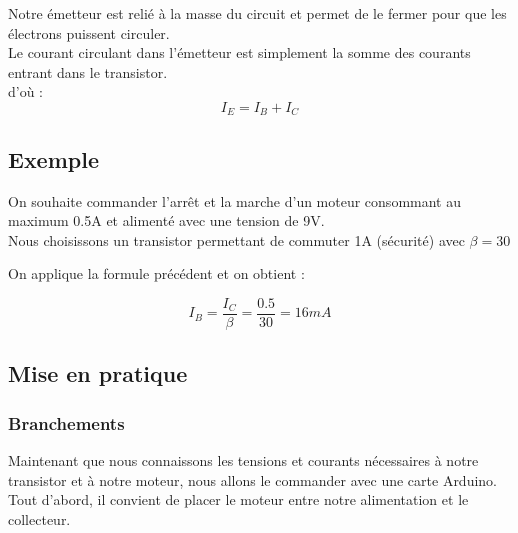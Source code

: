 {

\begin{reponse}
  
  Notre émetteur est relié à la masse du circuit et permet de le fermer pour que les électrons puissent circuler.\\

  Le courant circulant dans l'émetteur est simplement la somme des courants entrant dans le transistor. \\
  d'où : $$ \boxed{ I_{E} = I_{B} + I_{C} }$$

  \end{reponse}



\subsection{Exemple}

On souhaite commander l'arrêt et la marche d'un moteur consommant au maximum 0.5A et alimenté avec une tension de 9V. \\
Nous choisissons un transistor permettant de commuter 1A (sécurité) avec $\beta=30$ \\



\begin{reponse}
  On applique la formule précédent et on obtient : 

  $$  I_{B} = \frac{I_{C}}{\beta} = \frac{0.5}{30} = 16 mA $$

  \end{reponse}

 

\subsection{Mise en pratique}

\subsubsection{Branchements}

    Maintenant que nous connaissons les tensions et courants nécessaires à notre transistor et à notre moteur, nous allons le commander avec une carte Arduino. \\

    Tout d'abord, il convient de placer le moteur entre notre alimentation et le collecteur.\\
    

}
